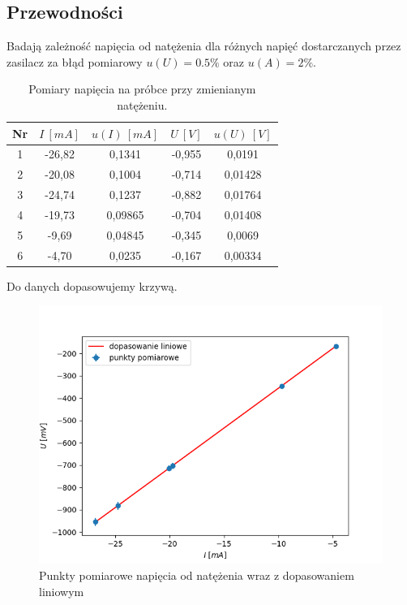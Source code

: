 \documentclass[12pt]{article}
\begin{document}
\subsection{Przewodności}
Badają zależność napięcia od natężenia dla różnych napięć dostarczanych przez zasilacz za błąd pomiarowy\cite{multimeter_hand} $u(U) = 0.5\%$ oraz $u(A) = 2\%$. 
\begin{table}[h]
    \centering
    \begin{tabular}{c|cc|cc}
        \toprule
        Nr & $I \ [mA]$ & $u(I) \ [mA]$ & $U \ [V]$ & $u(U) \ [V]$ \\
        \midrule
        1 & -26{,}82 & 0{,}1341  & -0{,}955 & 0{,}0191  \\
        2 & -20{,}08 & 0{,}1004  & -0{,}714 & 0{,}01428 \\
        3 & -24{,}74 & 0{,}1237  & -0{,}882 & 0{,}01764 \\
        4 & -19{,}73 & 0{,}09865 & -0{,}704 & 0{,}01408 \\
        5 & -9{,}69  & 0{,}04845 & -0{,}345 & 0{,}0069  \\
        6 & -4{,}70  & 0{,}0235  & -0{,}167 & 0{,}00334 \\
        \bottomrule
    \end{tabular}
    \caption{Pomiary napięcia na próbce przy zmienianym natężeniu.}
    \label{tab:ohm_measurements}
\end{table}
Do danych dopasowujemy krzywą.
\begin{figure}[H]
    \centering
    \includegraphics[scale=0.5]{ohm_law}
    \caption{Punkty pomiarowe napięcia od natężenia wraz z dopasowaniem liniowym}
    \label{fig:ohm_measurments}
\end{figure}
\end{document}
